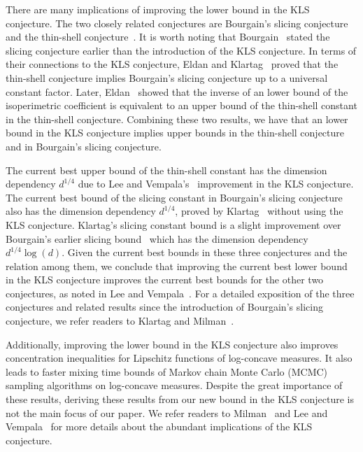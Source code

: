 \documentclass[11pt,twoside]{article}
\theoremstyle{named}
\theoremstyle{plain}
\newcommand{\usedim}{\ensuremath{d}}
\newcommand{\dims}{\usedim}
\begin{document}
There are many implications of improving the lower bound in the KLS conjecture. The two closely related conjectures are Bourgain's slicing conjecture~\cite{bourgain1986high,ball1988logarithmically} and the thin-shell conjecture~\cite{anttila2003central}. It is worth noting that Bourgain~\cite{bourgain1986high} stated the slicing conjecture earlier than the introduction of the KLS conjecture. In terms of their connections to the KLS conjecture, Eldan and Klartag~\cite{eldan2011approximately} proved that the thin-shell conjecture implies Bourgain's slicing conjecture up to a universal constant factor. Later, Eldan~\cite{eldan2013thin} showed that the inverse of an lower bound of the isoperimetric coefficient is equivalent to an upper bound of the thin-shell constant in the thin-shell conjecture. Combining these two results, we have that an lower bound in the KLS conjecture implies upper bounds in the thin-shell conjecture and in Bourgain's slicing conjecture.

The current best upper bound of the thin-shell constant has the dimension dependency $\dims^{1/4}$ due to Lee and Vempala's~\cite{lee2016eldan} improvement in the KLS conjecture. The current best bound of the slicing constant in Bourgain's slicing conjecture also has the dimension dependency $\dims^{1/4}$, proved by Klartag~\cite{klartag2006convex} without using the KLS conjecture. Klartag's slicing constant bound is a slight improvement over Bourgain’s earlier slicing bound~\cite{bourgain1986high} which has the dimension dependency $\dims^{1/4}\log(\dims)$. Given the current best bounds in these three conjectures and the relation among them, we conclude that improving the current best lower bound in the KLS conjecture improves the current best bounds for the other two conjectures, as noted in Lee and Vempala~\cite{lee2018kannan}. For a detailed exposition of the three conjectures and related results since the introduction of Bourgain's slicing conjecture, we refer readers to Klartag and Milman~\cite{klartag2021slicing}.

Additionally, improving the lower bound in the KLS conjecture also improves concentration inequalities for Lipschitz functions of log-concave measures. It also leads to faster mixing time bounds of Markov chain Monte Carlo (MCMC) sampling algorithms on log-concave measures. Despite the great importance of these results, deriving these results from our new bound in the KLS conjecture is not the main focus of our paper. We refer readers to Milman~\cite{milman2009role} and Lee and Vempala~\cite{lee2018kannan} for more details about the abundant implications of the KLS conjecture.
\end{document}
